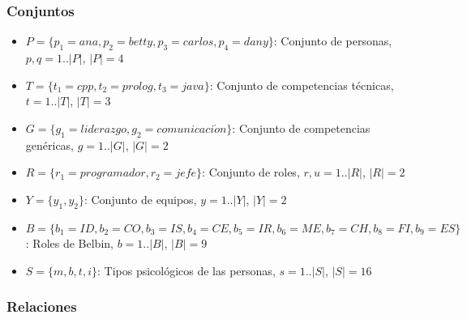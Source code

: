 
\subsubsection{Conjuntos}
\begin{itemize}
  \item $P=\{p_1=ana, p_2=betty, p_3=carlos, p_4=dany\}$: Conjunto de personas, $p, q= 1.. |P|$, $|P|=4$
  \item $T=\{t_1=cpp, t_2=prolog, t_3=java\}$: Conjunto de competencias técnicas, $t= 1.. |T|$, $|T|=3$
  \item $G=\{g_1=liderazgo, g_2=comunicaci\acute{o}n\}$: Conjunto de competencias genéricas, $g= 1.. |G|$, $|G|=2$
  \item $R=\{r_1=programador,r_2=jefe\}$: Conjunto de roles, $r,u= 1.. |R|$, $|R|=2$
  \item $Y=\{y_1,y_2\}$: Conjunto de equipos, $y= 1.. |Y|$, $|Y|=2$
  \item $B=\{b_1=ID,b_2=CO,b_3=IS,b_4=CE,b_5=IR,b_6=ME,b_7=CH,b_8=FI,b_9=ES\}$: Roles de Belbin, $b= 1.. |B|$, $|B|=9$
  \item $S= \{m,b,t,i\}$: Tipos psicológicos de las personas, $s= 1.. |S| $, $|S|=16$
   
\end{itemize}

\subsubsection{Relaciones}

